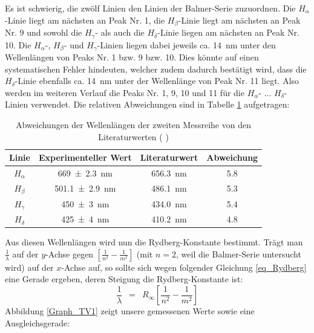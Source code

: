 \documentclass{article}
\newcommand{\widespace}{\enspace}
\newcommand{\wideeq}{\widespace = \widespace}
\newcommand{\coderef}[1]{%
    \text{\footnotesize \colorbox{codebg}{\texttt{#1()}}}%
}
\begin{document}
Es ist schwierig, die zwölf Linien den Linien der Balmer-Serie zuzuordnen.
Die $H_\alpha$-Linie liegt am nächsten an Peak Nr. 1,
die $H_\beta$-Linie liegt am nächsten an Peak Nr. 9
und sowohl die $H_\gamma$- als auch die $H_\delta$-Linie liegen am nächsten
an Peak Nr. 10. Die $H_\alpha$-, $H_\beta$- und $H_\gamma$-Linien liegen dabei
jeweils ca. \qty{14}{\nm} unter den Wellenlängen von Peaks Nr. 1 bzw. 9 bzw. 10.
Dies könnte auf einen systematischen Fehler hindeuten, welcher zudem dadurch
bestätigt wird, dass die $H_\delta$-Linie ebenfalls ca. \qty{14}{\nm} unter der
Wellenlänge von Peak Nr. 11 liegt.
Also werden im weiteren Verlauf die Peaks Nr. 1, 9, 10 und 11 für die
$H_\alpha$- ... $H_\delta$-Linien verwendet.
Die relativen Abweichungen sind in Tabelle \ref{TV1_Balmer-Serie} aufgetragen:

\begin{table}[H]
    \centering
    \begin{tabular}{c|c|c|c}
        Linie & Experimenteller Wert & Literaturwert & Abweichung \\
        \hline
        $H_\alpha$ & \qty{669 \pm 2.3}{\nm}   & \qty{656.3}{\nm} & \num{5.8} \\
        $H_\beta$  & \qty{501.1 \pm 2.9}{\nm} & \qty{486.1}{\nm} & \num{5.3} \\
        $H_\gamma$ & \qty{450 \pm 3}{\nm}     & \qty{434.0}{\nm} & \num{5.4} \\
        $H_\delta$ & \qty{425 \pm 4}{\nm}     & \qty{410.2}{\nm} & \num{4.8}
    \end{tabular}
    \caption{Abweichungen der Wellenlängen der zweiten Messreihe
    von den Literaturwerten (\coderef{tv1})}
    \label{TV1_Balmer-Serie}
\end{table}

Aus diesen Wellenlängen wird nun die Rydberg-Konstante bestimmt.
Trägt man $\frac 1 \lambda$ auf der $y$-Achse gegen
$\left[ \frac{1}{n^2} - \frac{1}{m^2} \right]$ (mit $n = 2$, weil die
Balmer-Serie untersucht wird) auf der $x$-Achse auf, so sollte sich wegen folgender
Gleichung \ref{eq_Rydberg} eine Gerade ergeben,
deren Steigung die Rydberg-Konstante ist:
\begin{equation}
    \frac 1 \lambda \wideeq R_\infty \left[ \frac{1}{n^2} - \frac{1}{m^2} \right]
    \label{eq_Rydberg}
\end{equation}
Abbildung \ref{Graph_TV1} zeigt unsere gemessenen Werte sowie eine Ausgleichsgerade:
\end{document}
